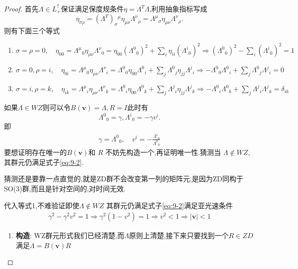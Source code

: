 \documentclass[../main.tex]{subfiles}
\begin{document}
\begin{proof}
	首先$\Lambda \in L^\uparrow_+$保证满足保度规条件$\eta = \Lambda^T \Lambda$,利用抽象指标写成
	\[
		\eta_{\sigma\rho} = (\Lambda^T)_\sigma{}^\mu \eta_{\mu\nu}\Lambda^\nu{}_\rho=\Lambda^\mu{}_\sigma \eta_{\mu\nu}\Lambda^\nu{}_\rho
		.\]则有下面三个等式
	\begin{enumerate}
		\item $\sigma = \rho = 0, \quad \eta_{00} = \Lambda^\mu{}_0 \eta_{\mu\nu} \Lambda^{\nu}{}_{0} =\eta_{00}(\Lambda^{0}{}_{0})^2 + \sum\limits_i \eta_{ii} (\Lambda^i{}_0)^2 \Rightarrow  (\Lambda^{0}{}_{0})^2 - \sum\limits_i (\Lambda^i{}_0)^2 = 1$
		\item $\sigma = 0,\rho = i, \quad  \eta_{0i} = \Lambda^\mu{}_0 \eta_{\mu\nu} \Lambda^{\nu}{}_{i} =\Lambda^{0}{}_{0}\eta_{00} \Lambda^{0}{}_{i}+ \sum\limits_j\Lambda^{0}{}_{j}\eta_{jj}\Lambda^{j}{}_{i} \Rightarrow  -\Lambda^{0}{}_{0}\Lambda^{0}{}_{i}+ \sum\limits_j\Lambda^{0}{}_{j}\Lambda^{j}{}_{i} = 0 $
		\item $\sigma = i , \rho = k, \quad \eta_{ik} = \Lambda^{\mu}{}_{i} \eta_{\mu\nu}\Lambda^{\nu}{}_{k} = \Lambda^{0}{}_{i} \eta_{00} \Lambda^{0}{}_{k} + \sum\limits_{j} \Lambda^{j}{}_{i}\eta_{jj}\Lambda^{j}{}_{k} \Rightarrow -\Lambda^{0}{}_{i}\Lambda^{0}{}_{k} + \sum\limits_{j} \Lambda^{j}{}_{i}\Lambda^{j}{}_{k} = \delta_{ik}$
	\end{enumerate}
	如果$\Lambda \in WZ$则可以令$B(\bm{v}) = \Lambda, R = I$此时有\[
		\Lambda^{0}{}_{0} = \gamma, \Lambda^{i}{}_{0} = -\gamma v^i
		.\] 即
	\begin{align}
		\gamma = \Lambda^{0}{}_{0},\quad v^i = -\frac{\Lambda^{i}{}_{0}}{\Lambda^{0}{}_{0}}
		\label{eq:9-2}
	\end{align}
	要想证明存在唯一的$B(\bm{v})$和 $R $ 不妨先构造一个,再证明唯一性.猜测当 $\Lambda \not\in WZ$,其群元仍满足式子\ref{eq:9-2}.
	\begin{note}
		猜测还是要靠一点直觉的,就是ZD群不会改变第一列的矩阵元,是因为ZD同构于SO(3)群,而且是针对空间的,对时间无效.
	\end{note}
	代入等式1,不难验证即使$\Lambda \not\in  WZ$ 其群元仍满足式子\ref{eq:9-2}满足亚光速条件
	\begin{align*}
		\gamma^2 - \gamma^2 v^2 = 1 \Rightarrow \gamma^2(1 - v^2) = 1 \Rightarrow v^2 < 1 \Rightarrow  \mid \bm{v}  \mid  < 1
	\end{align*}
	\begin{enumerate}
		\item \textbf{构造}: WZ群元形式我们已经清楚,而$\Lambda$原则上清楚,接下来只要找到一个$R \in  ZD$满足$\Lambda = B(\bm{v})R$

\end{enumerate}
\end{proof}
\end{document}
